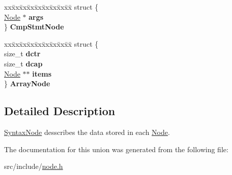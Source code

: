\begin{DoxyCompactItemize}
\begin{tabbing}
\end{tabbing}\item 
\mbox{\label{union_syntax_node_a57ac91017fd67029cde318d0d26225f0}} 
\begin{tabbing}
xx\=xx\=xx\=xx\=xx\=xx\=xx\=xx\=xx\=\kill
struct \{\\
\>\mbox{\hyperlink{struct_node}{Node}} $\ast$ {\bfseries args}\\
\} {\bfseries CmpStmtNode}\\

\end{tabbing}\item 
\mbox{\label{union_syntax_node_ab6061f4ce3222e14ea4dca4fcb1e4af6}} 
\begin{tabbing}
xx\=xx\=xx\=xx\=xx\=xx\=xx\=xx\=xx\=\kill
struct \{\\
\>size\_t {\bfseries dctr}\\
\>size\_t {\bfseries dcap}\\
\>\mbox{\hyperlink{struct_node}{Node}} $\ast$$\ast$ {\bfseries items}\\
\} {\bfseries ArrayNode}\\

\end{tabbing}\end{DoxyCompactItemize}


\subsection{Detailed Description}
\mbox{\hyperlink{union_syntax_node}{Syntax\+Node}} desscribes the data stored in each \mbox{\hyperlink{struct_node}{Node}}. 

The documentation for this union was generated from the following file\+:\begin{DoxyCompactItemize}
\item 
src/include/\mbox{\hyperlink{node_8h}{node.\+h}}\end{DoxyCompactItemize}
